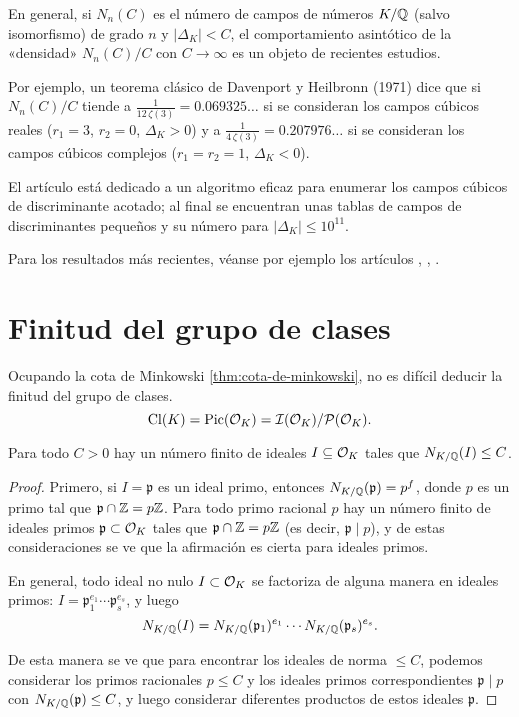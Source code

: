 \begin{comentario}
  En general, si $N_n (C)$ es el número de campos de números $K/\mathbb{Q}$
  (salvo isomorfismo) de grado $n$ y $|\Delta_K| < C$, el comportamiento
  asintótico de la «densidad» $N_n (C)/C$ con $C \to \infty$ es un objeto de
  recientes estudios.

  Por ejemplo, un teorema clásico de Davenport y Heilbronn (1971) dice que si
  $N_n (C)/C$ tiende a $\frac{1}{12\,\zeta (3)} = 0.069325\dots$ si se
  consideran los campos cúbicos reales ($r_1 = 3$, $r_2 = 0$, $\Delta_K > 0$)
  y a $\frac{1}{4\,\zeta (3)} = 0.207976\dots$ si se consideran los campos
  cúbicos complejos ($r_1 = r_2 = 1$, $\Delta_K < 0$).

  El artículo \cite{Belabas-1997} está dedicado a un algoritmo eficaz para
  enumerar los campos cúbicos de discriminante acotado; al final se encuentran
  unas tablas de campos de discriminantes pequeños y su número para
  $|\Delta_K| \le 10^{11}$.

  Para los resultados más recientes, véanse por ejemplo los artículos
  \cite{Bhargava-2005}, \cite{Bhargava-2010}, \cite{Belabas-Bhargava-Pomerance}.
\end{comentario}


\iffalse
\section{Finitud del grupo de clases}

Ocupando la cota de Minkowski \ref{thm:cota-de-minkowski}, no es difícil deducir
la finitud del grupo de clases.
$$\operatorname{Cl} (K) = \operatorname{Pic} (\mathcal{O}_K) = \mathcal{I} (\mathcal{O}_K) / \mathcal{P} (\mathcal{O}_K).$$

\begin{lema}
  Para todo $C > 0$ hay un número finito de ideales $I \subseteq \mathcal{O}_K$ tales que
  $N_{K/\mathbb{Q}} (I) \le C$.

  \begin{proof}
    Primero, si $I = \mathfrak{p}$ es un ideal primo, entonces
    $N_{K/\mathbb{Q}} (\mathfrak{p}) = p^f$, donde $p$ es un primo tal que
    $\mathfrak{p}\cap\mathbb{Z} = p\mathbb{Z}$. Para todo primo racional $p$ hay un número
    finito de ideales primos $\mathfrak{p} \subset \mathcal{O}_K$ tales que
    $\mathfrak{p}\cap\mathbb{Z} = p\mathbb{Z}$ (es decir, $\mathfrak{p} \mid p$), y de estas
    consideraciones se ve que la afirmación es cierta para ideales primos.

    En general, todo ideal no nulo $I \subset \mathcal{O}_K$ se factoriza de alguna
    manera en ideales primos:
    $I = \mathfrak{p}_1^{e_1}\cdots \mathfrak{p}_s^{e_s}$, y luego
    $$N_{K/\mathbb{Q}} (I) = N_{K/\mathbb{Q}} (\mathfrak{p}_1)^{e_1}\cdots N_{K/\mathbb{Q}} (\mathfrak{p}_s)^{e_s}.$$

    De esta manera se ve que para encontrar los ideales de norma $\le C$,
    podemos considerar los primos racionales $p \le C$ y los ideales primos
    correspondientes $\mathfrak{p} \mid p$ con $N_{K/\mathbb{Q}} (\mathfrak{p}) \le C$,
    y luego considerar diferentes productos de estos ideales $\mathfrak{p}$.
  \end{proof}
\end{lema}

